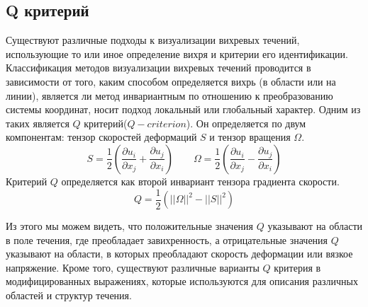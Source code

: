 \subsection{Q критерий}
	Существуют различные подходы к визуализации вихревых течений, использующие то или иное определение вихря и критерии его идентификации. Классификация методов визуализации вихревых течений проводится в зависимости от того, каким способом определяется вихрь (в области или на линии), является ли метод инвариантным по отношению к преобразованию системы координат, носит подход локальный или глобальный характер\cite{Hunt1988}. Одним из таких является $Q$ критерий($Q-criterion$). Он определяется по двум компонентам: тензор скоростей деформаций $S$ и тензор вращения $\Omega$. 
	\begin{equation}
		S = \frac{1}{2}(\frac{\partial u_i}{\partial x_j} + \frac{\partial u_j}{\partial x_i}) \qquad \Omega = \frac{1}{2}(\frac{\partial u_i}{\partial x_j} - \frac{\partial u_j}{\partial x_i})
	\end{equation}
	Критерий $Q$ определяется как второй инвариант тензора градиента скорости\cite{Wiebel2007}.
	\begin{equation}
		Q = \frac{1}{2}(||\Omega||^2 - ||S||^2)
	\end{equation}
	
	Из этого мы можем видеть, что положительные значения $Q$ указывают на области в поле течения, где преобладает завихренность, а отрицательные значения $Q$ указывают на области, в которых преобладают скорость деформации или вязкое напряжение. Кроме того, существуют различные варианты $Q$ критерия в модифицированных выражениях, которые используются для описания различных областей и структур течения\cite{Berdahl1993,Chong1990}.
	
